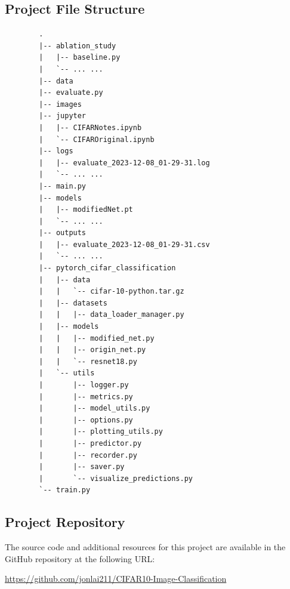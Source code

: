 \documentclass[conference]{IEEEtran}
\begin{document}
	\subsection{Project File Structure}
	\begin{verbatim}
		.
		|-- ablation_study
		|   |-- baseline.py
		|   `-- ... ...
		|-- data
		|-- evaluate.py
		|-- images
		|-- jupyter
		|   |-- CIFARNotes.ipynb
		|   `-- CIFAROriginal.ipynb
		|-- logs
		|   |-- evaluate_2023-12-08_01-29-31.log
		|   `-- ... ...
		|-- main.py
		|-- models
		|   |-- modifiedNet.pt
		|   `-- ... ...
		|-- outputs
		|   |-- evaluate_2023-12-08_01-29-31.csv
		|   `-- ... ...
		|-- pytorch_cifar_classification
		|   |-- data
		|   |   `-- cifar-10-python.tar.gz
		|   |-- datasets
		|   |   |-- data_loader_manager.py
		|   |-- models
		|   |   |-- modified_net.py
		|   |   |-- origin_net.py
		|   |   `-- resnet18.py
		|   `-- utils
		|       |-- logger.py
		|       |-- metrics.py
		|       |-- model_utils.py
		|       |-- options.py
		|       |-- plotting_utils.py
		|       |-- predictor.py
		|       |-- recorder.py
		|       |-- saver.py
		|       `-- visualize_predictions.py
		`-- train.py
	\end{verbatim}
	
	\subsection{Project Repository}
	The source code and additional resources for this project are available in the GitHub repository at the following URL:
	
	\url{https://github.com/jonlai211/CIFAR10-Image-Classification}
	
\end{document}
